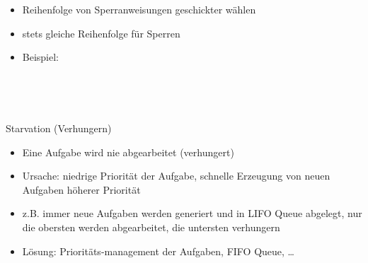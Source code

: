 \begin{itemize}
\item Reihenfolge von Sperranweisungen geschickter wählen
\item stets gleiche Reihenfolge für Sperren
\item Beispiel:
\end{itemize}
~

~

Starvation (Verhungern)

\begin{itemize}
\item Eine Aufgabe wird nie abgearbeitet (verhungert)
\item Ursache: niedrige Priorität der Aufgabe, schnelle Erzeugung von neuen Aufgaben höherer Priorität
\item z.B. immer neue Aufgaben werden generiert und in LIFO Queue abgelegt, nur die obersten werden abgearbeitet, die untersten verhungern
\item Lösung: Prioritäts-management der Aufgaben, FIFO Queue, … 
\end{itemize}
\endinput
